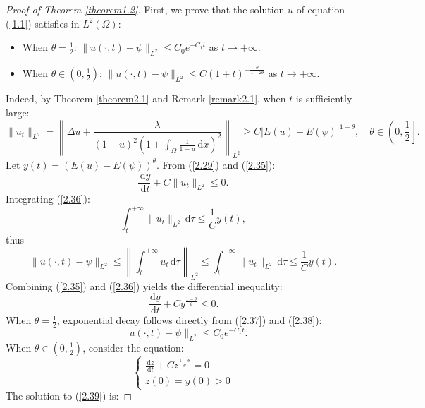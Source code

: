 \documentclass[10pt,a4paper]{amsart}
\begin{document}
\begin{proof}[Proof of Theorem \ref{theorem1.2}]
First, we prove that the solution $u$ of equation (\ref{1.1}) satisfies in $L^2(\Omega)$:
\begin{itemize}
    \item When $\theta=\frac{1}{2}$: $\|u(\cdot,t)-\psi\|_{L^2}\le C_0e^{-C_1t}$ as $t\to +\infty$.
    \item When $\theta\in (0,\frac{1}{2})$: $\|u(\cdot,t)-\psi\|_{L^2}\le C(1+t)^{-\frac{\theta}{1-2\theta}}$ as $t\to +\infty$.
\end{itemize}
  Indeed, by Theorem \ref{theorem2.1} and Remark \ref{remark2.1}, when $t$ is sufficiently large:
  \begin{equation}
    \|u_t\|_{L^2}= \left\|\Delta u+\frac{\lambda}{(1-u)^2(1+\int_{\Omega}\frac{1}{1-u}\,\mathrm{d}x)^2}\right\|_{L^{2}}\ge C|E(u)-E(\psi)|^{1-\theta},\quad \theta\in\left (0,\frac{1}{2}\right ].\label{2.35}
  \end{equation}
  Let $y(t)=(E(u)-E(\psi))^{\theta}$. From (\ref{2.29}) and (\ref{2.35}):
  \begin{equation}
      \frac{\,\mathrm{d}y}{\,\mathrm{d}t}+C\|u_t\|_{L^2}\le 0.\label{2.36}
  \end{equation}
  Integrating (\ref{2.36}):
  $$\int_{t}^{+\infty}\|u_t\|_{L^2}\,\mathrm{d}\tau\le \frac{1}{C}y(t),$$
  thus
  \begin{equation}
      \|u(\cdot,t)-\psi\|_{L^2}\le\left\|\int_{t}^{+\infty}u_t\,\mathrm{d}\tau\right\|_{L^2}\le\int_{t}^{+\infty}\|u_t\|_{L^2}\,\mathrm{d}\tau\le \frac{1}{C}y(t).\label{2.37}
  \end{equation}
  Combining (\ref{2.35}) and (\ref{2.36}) yields the differential inequality:
  \begin{equation}
      \frac{\,\mathrm{d}y}{\,\mathrm{d}t}+Cy^{\frac{1-\theta}{\theta}}\le 0.\label{2.38}
  \end{equation}
  \noindent
  When $\theta=\frac{1}{2}$, exponential decay follows directly from (\ref{2.37}) and (\ref{2.38}):
  $$\|u(\cdot,t)-\psi\|_{L^2}\le C_0e^{-C_1t}.$$
  \noindent
  When $\theta\in (0,\frac{1}{2})$, consider the equation:
  \begin{equation}
      \begin{cases}
          \frac{\,\mathrm{d}z}{\,\mathrm{d}t}+Cz^{\frac{1-\theta}{\theta}}=0 \\
          z(0)=y(0)>0 \label{2.39}
      \end{cases}
  \end{equation}
  The solution to (\ref{2.39}) is:

\end{proof}
\end{document}

